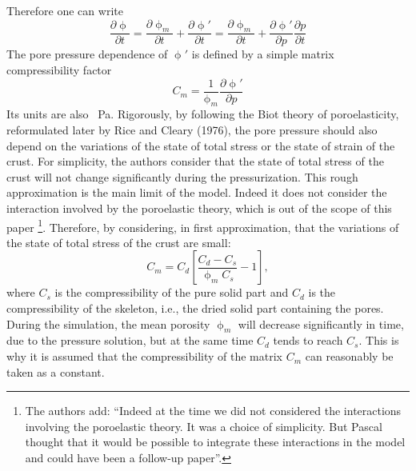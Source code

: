 Therefore one can write
\begin{equation}
\frac{\partial \upphi}{\partial t}
=\frac{\partial \upphi_m}{\partial t} +\frac{\partial \upphi'}{\partial t}
=\frac{\partial \upphi_m}{\partial t} +\frac{\partial \upphi'}{\partial p} \frac{\partial p}{\partial t}
\label{eq:por25}
\end{equation}
The pore pressure dependence of $\upphi'$ is defined by a
simple matrix compressibility factor
\begin{equation}
C_m = \frac{1}{\upphi_m}\frac{\partial \upphi'}{\partial p}
\label{eq:por24}
\end{equation}
Its units are also \si{\per\pascal}.
Rigorously, by following the Biot theory of poroelasticity,
reformulated later by Rice and Cleary (1976), the pore
pressure should also depend on the variations of the state of
total stress or the state of strain of the crust. For simplicity,
the authors consider that the state of total stress of the crust will
not change significantly during the pressurization. This
rough approximation is the main limit of the model. Indeed
it does not consider the interaction involved by the
poroelastic theory, which is out of the scope of this paper
\footnote{The authors add: ``Indeed at the time we did not considered 
the interactions involving the poroelastic theory. It was a choice of simplicity. 
But Pascal thought that it would be possible to integrate these interactions in 
the model and could have been a follow-up paper''.}.
Therefore, by considering, in first approximation, that the
variations of the state of total stress of the crust are small:
\begin{equation}
C_m = C_d \left[ \frac{C_d - C_s}{\upphi_m C_s } - 1  \right],
\end{equation}
where $C_s$ is the compressibility of the pure solid part and $C_d$ is the
compressibility of the skeleton, i.e., the dried solid part
containing the pores. During the simulation, the mean
porosity $\upphi_m$ will decrease significantly in time, due to the
pressure solution, but at the same time $C_d$ tends to reach $C_s$.
This is why it is assumed that the compressibility of the
matrix $C_m$ can reasonably be taken as a constant. 

